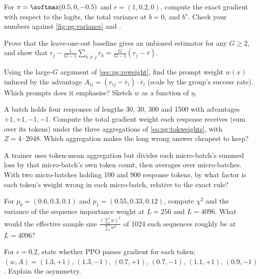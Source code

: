 \begin{exercise}
For $\pi=\softmax(0.5,0,-0.5)$ and $r=(1,0.2,0)$, compute the exact gradient with respect to the
logits, the total variance at $b=0$, and $b^\star$. Check your numbers against
\cref{fig:pg:variance} and .
\end{exercise}

\begin{exercise}
Prove that the leave-one-out baseline gives an unbiased estimator for any $G\ge2$, and show that
$r_j-\frac{1}{G-1}\sum_{k\ne j}r_k=\frac{G}{G-1}(r_j-\bar r)$.
\end{exercise}

\begin{exercise}
Using the large-$G$ argument of \cref{sec:pg:reweight}, find the prompt weight $w(x)$ induced by
the advantage $A_{ij}=(r_{ij}-\bar r_i)\cdot\bar r_i$ (scale by the group's success rate). Which
prompts does it emphasise? Sketch $w$ as a function of $\eta$.
\end{exercise}

\begin{exercise}
A batch holds four responses of lengths 30, 30, 300 and 1500 with advantages $+1,+1,-1,-1$.
Compute the total gradient weight each response receives (sum over its tokens) under the three
aggregations of \cref{eq:pg:tokweights}, with $Z=4\cdot2048$. Which aggregation makes the long
wrong answer cheapest to keep?
\end{exercise}

\begin{exercise}
A trainer uses token-mean aggregation but divides each micro-batch's summed loss by that
micro-batch's own token count, then averages over micro-batches. With two micro-batches
holding 100 and 900 response tokens, by what factor is each token's weight wrong in each
micro-batch, relative to the exact rule?
\end{exercise}

\begin{exercise}
For $p_0=(0.6,0.3,0.1)$ and $p_1=(0.55,0.33,0.12)$, compute $\chi^2$ and the variance of the
sequence importance weight at $L=256$ and $L=4096$. What would the effective sample size
$\frac{(\sum w)^2}{\sum w^2}$ of 1024 such sequences roughly be at $L=4096$?
\end{exercise}

\begin{exercise}
For $\epsilon=0.2$, state whether PPO passes gradient for each token:
$(w,A)=(1.3,+1),\,(1.3,-1),\,(0.7,+1),\,(0.7,-1),\,(1.1,+1),\,(0.9,-1)$. Explain the asymmetry.
\end{exercise}

